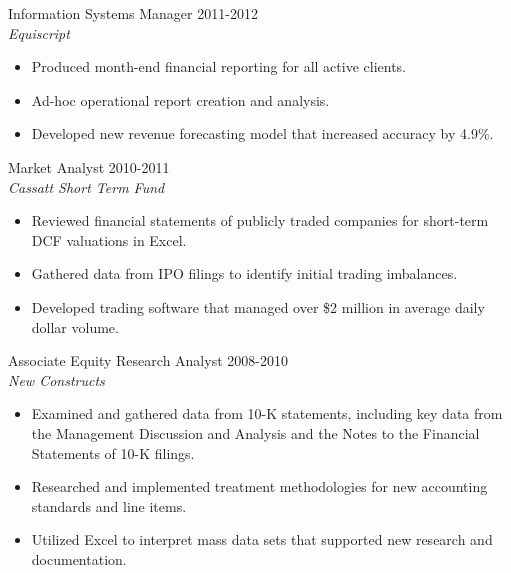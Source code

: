 \documentclass[line, margin]{res}
\begin{document}
\begin{resume}
{\large Information Systems Manager} \hfill 2011-2012\\
\textit{Equiscript}
\begin{itemize}[leftmargin=10pt]
\item  Produced month-end financial reporting for all active clients.
\item Ad-hoc operational report creation and analysis. 
\item Developed new revenue forecasting model that increased accuracy by 4.9\%.
\end{itemize}

{\large Market Analyst} \hfill 2010-2011\\
\textit{Cassatt Short Term Fund}
\begin{itemize}[leftmargin=10pt]
\item  Reviewed financial statements of publicly traded companies for short-term DCF valuations in Excel.
\item Gathered data from IPO filings to identify initial trading imbalances. 
\item Developed trading software that managed over \$2 million in average daily dollar volume.
\end{itemize}
 
{\large Associate Equity Research Analyst} \hfill 2008-2010\\
\textit{New Constructs}
\begin{itemize}[leftmargin=10pt]
\item Examined and gathered data from 10-K statements, including key data from the Management Discussion and Analysis and the Notes to the Financial Statements of 10-K filings.
\item Researched and implemented treatment methodologies for new accounting standards and line items.
\item Utilized Excel to interpret mass data sets that supported new research and documentation.
\end{itemize}

\end{resume}
\end{document}
